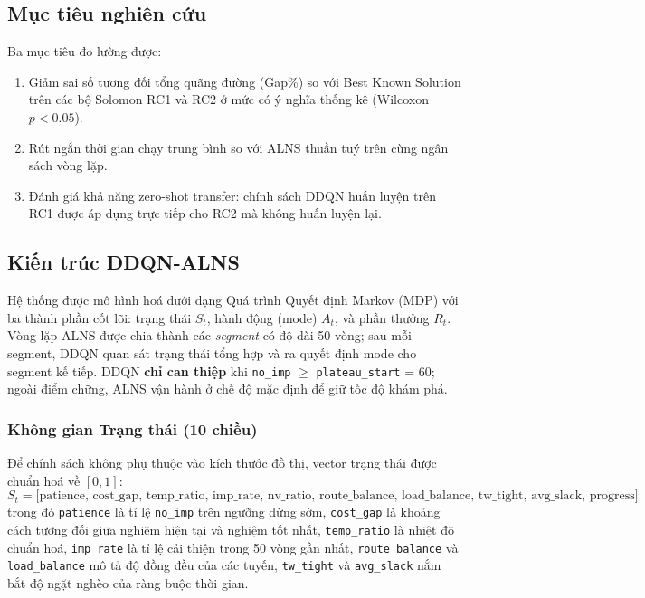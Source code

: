 \documentclass[13pt, a4paper]{extarticle} %
\begin{document}
\subsection{Mục tiêu nghiên cứu}
Ba mục tiêu đo lường được:
\begin{enumerate}
    \item Giảm sai số tương đối tổng quãng đường (Gap\%) so với Best Known Solution trên các bộ Solomon RC1 và RC2 ở mức có ý nghĩa thống kê (Wilcoxon $p < 0.05$).
    \item Rút ngắn thời gian chạy trung bình so với ALNS thuần tuý trên cùng ngân sách vòng lặp.
    \item Đánh giá khả năng zero-shot transfer: chính sách DDQN huấn luyện trên RC1 được áp dụng trực tiếp cho RC2 mà không huấn luyện lại.
\end{enumerate}

\subsection{Kiến trúc DDQN-ALNS}

Hệ thống được mô hình hoá dưới dạng Quá trình Quyết định Markov (MDP) với ba thành phần cốt lõi: trạng thái $S_t$, hành động (mode) $A_t$, và phần thưởng $R_t$. Vòng lặp ALNS được chia thành các \textit{segment} có độ dài 50 vòng; sau mỗi segment, DDQN quan sát trạng thái tổng hợp và ra quyết định mode cho segment kế tiếp. DDQN \textbf{chỉ can thiệp} khi \texttt{no\_imp} $\ge$ \texttt{plateau\_start} = 60; ngoài điểm chững, ALNS vận hành ở chế độ mặc định để giữ tốc độ khám phá.

\subsubsection{Không gian Trạng thái (10 chiều)}
Để chính sách không phụ thuộc vào kích thước đồ thị, vector trạng thái được chuẩn hoá về $[0, 1]$:
\[
S_t = \big[\text{patience},\, \text{cost\_gap},\, \text{temp\_ratio},\, \text{imp\_rate},\, \text{nv\_ratio},\, \text{route\_balance},\, \text{load\_balance},\, \text{tw\_tight},\, \text{avg\_slack},\, \text{progress}\big]
\]
trong đó \texttt{patience} là tỉ lệ \texttt{no\_imp} trên ngưỡng dừng sớm, \texttt{cost\_gap} là khoảng cách tương đối giữa nghiệm hiện tại và nghiệm tốt nhất, \texttt{temp\_ratio} là nhiệt độ chuẩn hoá, \texttt{imp\_rate} là tỉ lệ cải thiện trong 50 vòng gần nhất, \texttt{route\_balance} và \texttt{load\_balance} mô tả độ đồng đều của các tuyến, \texttt{tw\_tight} và \texttt{avg\_slack} nắm bắt độ ngặt nghèo của ràng buộc thời gian.
\end{document}
